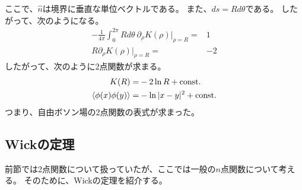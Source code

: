 \documentclass[11pt, dvipdfmx]{article}
\numberwithin{equation}{section}
\newcommand{\blankline}{\par\vspace{\baselineskip}} %
\begin{document}
ここで、$\hat{n}$は境界に垂直な単位ベクトルである。
また、$ds=R d\theta$である。
したがって、次のようになる。
\begin{align}
    -\frac{1}{4\pi}\int_0^{2\pi}R d\theta \ \partial_{\rho} K(\rho)\Big|_{\rho=R}=&1\\
   R \partial_{\rho} K(\rho)\Big|_{\rho=R}=&-2
\end{align}
したがって、次のように2点関数が求まる。
\begin{align}
    K(R)=&-2\ln R + \text{const.} \\
    \ev{\phi(x)\phi(y)}=&- \ln |x-y|^2 + \text{const.}
\end{align}
つまり、自由ボソン場の2点関数の表式が求まった。
\subsection{Wickの定理}
前節では2点関数について扱っていたが、ここでは一般の$n$点関数について考える。
そのために、Wickの定理を紹介する。
\blankline
\end{document}
